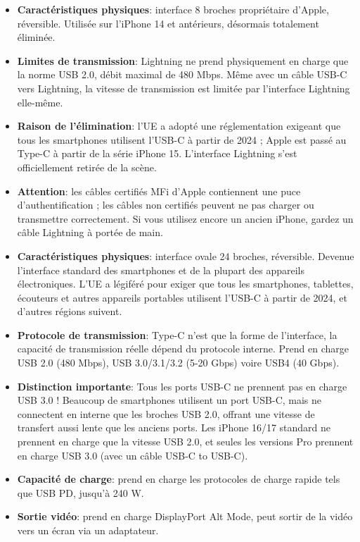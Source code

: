 
\begin{itemize}
  \item \textbf{Caractéristiques physiques}: interface 8 broches propriétaire d'Apple, réversible. Utilisée sur l'iPhone 14 et antérieurs, désormais totalement éliminée.
  \item \textbf{Limites de transmission}: Lightning ne prend physiquement en charge que la norme USB 2.0, débit maximal de 480 Mbps. Même avec un câble USB-C vers Lightning, la vitesse de transmission est limitée par l'interface Lightning elle-même.
  \item \textbf{Raison de l'élimination}: l'UE a adopté une réglementation exigeant que tous les smartphones utilisent l'USB-C à partir de 2024 ; Apple est passé au Type-C à partir de la série iPhone 15. L'interface Lightning s'est officiellement retirée de la scène.
  \item \textbf{Attention}: les câbles certifiés MFi d'Apple contiennent une puce d'authentification ; les câbles non certifiés peuvent ne pas charger ou transmettre correctement. Si vous utilisez encore un ancien iPhone, gardez un câble Lightning à portée de main.
\end{itemize}


\begin{itemize}
  \item \textbf{Caractéristiques physiques}: interface ovale 24 broches, réversible. Devenue l'interface standard des smartphones et de la plupart des appareils électroniques. L'UE a légiféré pour exiger que tous les smartphones, tablettes, écouteurs et autres appareils portables utilisent l'USB-C à partir de 2024, et d'autres régions suivent.
  \item \textbf{Protocole de transmission}: Type-C n'est que la forme de l'interface, la capacité de transmission réelle dépend du protocole interne. Prend en charge USB 2.0 (480 Mbps), USB 3.0/3.1/3.2 (5-20 Gbps) voire USB4 (40 Gbps).
  \item \textbf{Distinction importante}: Tous les ports USB-C ne prennent pas en charge USB 3.0 ! Beaucoup de smartphones utilisent un port USB-C, mais ne connectent en interne que les broches USB 2.0, offrant une vitesse de transfert aussi lente que les anciens ports. Les iPhone 16/17 standard ne prennent en charge que la vitesse USB 2.0, et seules les versions Pro prennent en charge USB 3.0 (avec un câble USB-C to USB-C).
  \item \textbf{Capacité de charge}: prend en charge les protocoles de charge rapide tels que USB PD, jusqu'à 240 W.
  \item \textbf{Sortie vidéo}: prend en charge DisplayPort Alt Mode, peut sortir de la vidéo vers un écran via un adaptateur.
\end{itemize}

